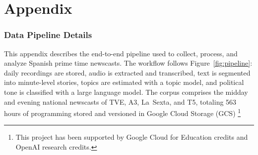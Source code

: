 \documentclass[12pt]{article}
\begin{document}
	
	
	
	
	
	
	
	
	\clearpage
	
	\pagestyle{plain}  
	
		
	
	
	
	\clearpage

\appendix

\part{Appendix} %

\parttoc %


\renewcommand\thefigure{\thesection.\arabic{figure}}   
\renewcommand\thetable{\thesection.\arabic{table}}
\setcounter{table}{0}


\clearpage






\section{Data Pipeline  Details}\label{sec:appendix_models}



This appendix describes the end-to-end pipeline used to collect, process, and analyze Spanish prime time newscasts. The workflow follows  Figure~\ref{fig:pipeline}: daily recordings are stored, audio is extracted and transcribed, text is segmented into minute-level stories, topics are estimated with a topic model, and political tone is classified with a large language model. The corpus comprises the midday and evening national newscasts of TVE, A3, La~Sexta, and T5, totaling {563 hours} of programming stored and versioned in Google Cloud Storage (GCS) \footnote{This project has been supported by Google Cloud for Education credits and OpenAI research credits.} %
\end{document}
